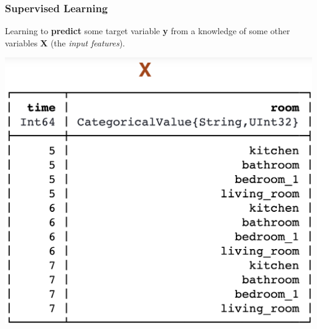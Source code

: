 \documentclass[t]{beamer}
\newcommand\df{\bf\color{Maroon}}
\begin{document}
\begin{frame}
  \frametitle{Supervised Learning}
  Learning to {\df predict} some target variable {\df\large y} from a
  knowledge of some other variables {\df \large X} (the {\it input features}).\pause
  \begin{center}
    \includegraphics[scale=0.17]{X.png}\mbox{~~~~}

\end{center}
\end{frame}
\end{document}
